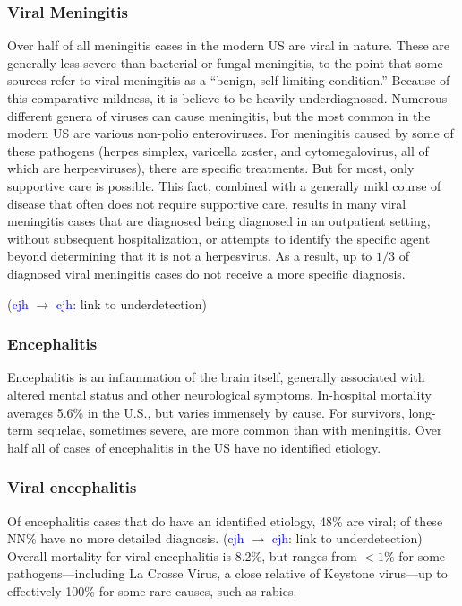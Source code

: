 \documentclass[12pt]{article}
\newcommand{\cjh}{\textcolor{blue}{cjh}}
\newcommand{\msg}[3]{(#1 $\rightarrow$ #2: #3)}
\newcommand{\mcc}[1]{\msg\cjh\cjh{#1}}
\begin{document}
        \subsubsection{Viral Meningitis}
            Over half of all meningitis cases in the modern US are viral in nature. These are generally less severe than bacterial or fungal meningitis, to the point that some sources refer to viral meningitis as a ``benign, self-limiting condition.''\cite{asdf} Because of this comparative mildness, it is believe to be heavily underdiagnosed. Numerous different genera of viruses can cause meningitis, but the most common in the modern US are various non-polio enteroviruses. For meningitis caused by some of these pathogens (herpes simplex, varicella zoster, and cytomegalovirus, all of which are herpesviruses), there are specific treatments. But for most, only supportive care is possible. This fact, combined with a generally mild course of disease that often does not require supportive care, results in many viral meningitis cases that are diagnosed being diagnosed in an outpatient setting, without subsequent hospitalization, or attempts to identify the specific agent beyond determining that it is not a herpesvirus. As a result, up to $1/3$ of diagnosed viral meningitis cases do not receive a more specific diagnosis.

            \mcc{link to underdetection}

        \subsubsection{Encephalitis}

            Encephalitis is an inflammation of the brain itself, generally associated with altered mental status and other neurological symptoms. In-hospital mortality averages 5.6\% in the U.S., but varies immensely by cause. For survivors, long-term sequelae, sometimes severe, are more common than with meningitis. Over half all of cases of encephalitis in the US have no identified etiology.
            
        \subsubsection{Viral encephalitis}
            Of encephalitis cases that do have an identified etiology, 48\% are viral; of these NN\% have no more detailed diagnosis. \mcc{link to underdetection} Overall mortality for viral encephalitis is 8.2\%, but ranges from $<1\%$ for some pathogens---including La Crosse Virus, a close relative of Keystone virus---up to effectively 100\% for some rare causes, such as rabies.
\end{document}
